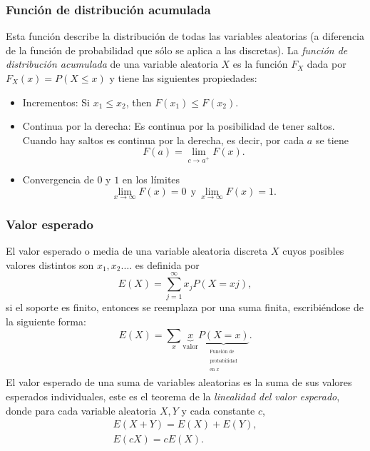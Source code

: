 \subsubsection {Función de distribución acumulada}
Esta función describe la distribución de todas las variables aleatorias (a diferencia de la función de probabilidad que sólo se aplica a las discretas). La \emph{función de distribución acumulada} de una variable aleatoria $X$ es la función $F_X$ dada por $F_X(x)=P(X\leq x)$ y tiene las siguientes propiedades:
\begin{itemize}
	\item Incrementos: Si $x_1\leq x_2$, then $F(x_1)\leq F(x_2)$.
	\item Continua por la derecha: Es continua por la posibilidad de tener saltos. Cuando hay saltos es continua por la derecha, es decir, por cada $a$ se tiene
	\begin{equation}
	F(a)=\lim_{c\to a^+}F(x).
	\end{equation}
	\item Convergencia de $0$ y $1$ en los límites
	\begin{equation}
	\lim_{x\to \infty}F(x)=0\ \ \text{y}\ \lim_{x\to \infty}F(x)=1.
	\end{equation}
\end{itemize}
\subsubsection {Valor esperado}
El valor esperado o media de una variable aleatoria discreta $X$ cuyos posibles valores distintos son $x_1,x_2.\ldots $ es definida por
\begin{equation}
E(X)=\sum_{j=1}^{\infty}x_jP(X=xj),
\end{equation}
si el soporte es finito, entonces se reemplaza por una suma finita, escribiéndose de la siguiente forma:
\begin{equation}
E(X)=\sum_{x}\underbrace{x}_\text{valor}\underbrace{P(X=x)}_{\begin{matrix}^\text{Función de}\\^\text{probabilidad}\\^\text{en $x$}\end{matrix}}.
\end{equation}
El valor esperado de una suma de variables aleatorias es la suma de sus valores esperados individuales, este es el teorema de la \emph{linealidad del valor esperado}, donde para cada variable aleatoria $X,Y$ y cada constante $c$,
\begin{equation}
\begin{matrix}
E(X+Y)=E(X)+E(Y),\\
E(cX)=cE(X).
\end{matrix}
\end{equation}
